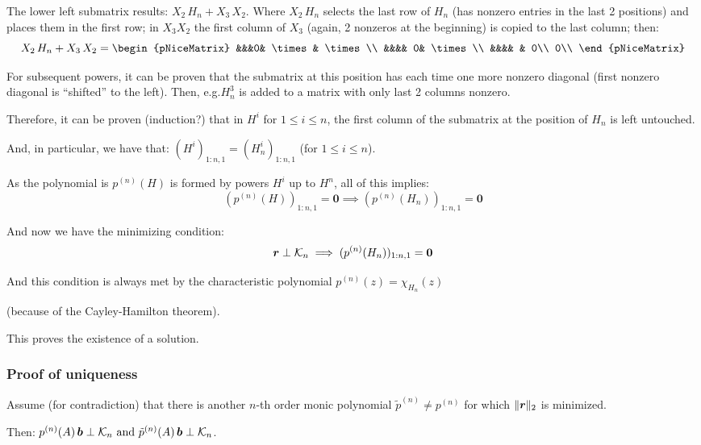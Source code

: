 \documentclass[
  12pt,
  paper=a4,
]{scrartcl} %
\begin{document}
The lower left submatrix results: $X_2\, H_n + X_3\, X_2$. Where $X_2\,H_n$ selects the last row of $H_n$ (has nonzero entries in the last 2 positions) and places them in the first row; in $X_3 X_2$ the first column of $X_3$ (again, 2 nonzeros at the beginning) is copied to the last column; then:
\[
    X_2\, H_n + X_3\, X_2 =
    \begin{pNiceMatrix}
        &&&0& \times& \times \\
        &&&& 0& \times \\
        &&&& & 0\\
        0\\
    \end{pNiceMatrix}
\]

For subsequent powers, it can be proven that the submatrix at this position has each time one more nonzero diagonal (first nonzero diagonal is ``shifted'' to the left). Then, e.g.\@ $H_n^3$ is added to a matrix with only last 2 columns nonzero.

Therefore, it can be proven (induction?) that in $H^i$ for $1\le i\le n$, the first column of the submatrix at the position of $H_n$ is left untouched.

And, in particular, we have that: $(H^i)_{1:n,1}=(H_n^i)_{1:n,1}$ (for $1\le i\le n$).

As the polynomial is $p^{(n)}(H)$ is formed by powers $H^i$ up to $H^n$, all of this implies: \[
    (p^{(n)}(H))_{1:n,1} = \bm 0
    \implies
    (p^{(n)}(H_n))_{1:n,1}= \bm 0
\]

And now we have the minimizing condition:
\[
\bm r \perp \mathcal{K}_n
    \implies
    (p^{(n)}(H_n))_{1:n,1}= \bm 0
\]

And this condition is always met by the characteristic polynomial $\displaystyle p^{(n)}(z) = \chi_{H_n}(z)$

(because of the Cayley-Hamilton theorem).

This proves the existence of a solution.

\subsubsection*{Proof of uniqueness}

Assume (for contradiction) that there is another $n$-th order monic polynomial $\tilde p^{(n)}\neq p^{(n)}$ for which $\|\bm r\|_2$ is minimized.

Then:
$p^{(n)}(A)\,\bm b\perp \mathcal{K}_n \text{ and } \tilde{p}^{(n)}(A)\,\bm b\perp \mathcal{K}_n$.
\end{document}
